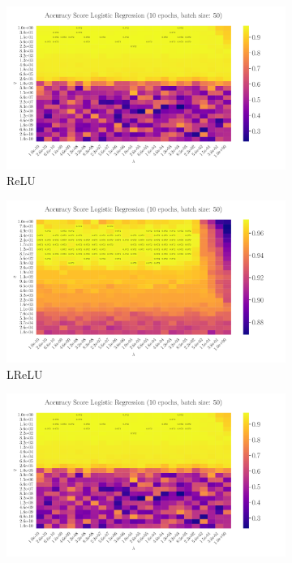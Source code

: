 \documentclass[%
reprint,
amsmath,amssymb,
aps,
]{revtex4-2}
\begin{document}
\begin{figure}
\begin{subfigure}{0.4353\textwidth}
	\includegraphics[width=\textwidth]{Python/Figures/LogReg25x25_epoch10_batchS50.pdf}
	\caption{ReLU}
	\label{fig:LogReg25x25_epoch10_bacthS50}
\end{subfigure}
\hfill
\begin{subfigure}{0.4353\textwidth}
	\includegraphics[width=\textwidth]{Python/Figures/LogReg25x25_epoch10_batchS50_zoomed.pdf}
	\caption{LReLU}
	\label{fig:LogReg25x25_epoch10_bacthS50_zoomed}
\end{subfigure}
\hfill\newline
\begin{subfigure}{0.4353\textwidth}
	\includegraphics[width=\textwidth]{Python/Figures/LogReg25x25_epoch10_batchS50.pdf}

\end{subfigure}
\end{figure}
\end{document}
